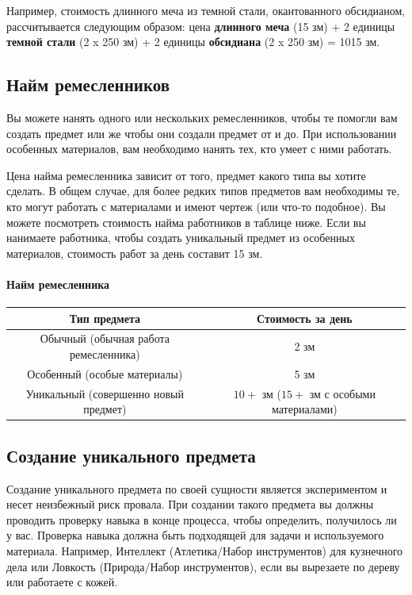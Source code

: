 \documentclass[a4paper, 9pt, twocolumn]{book}
\begin{document}
	Например, стоимость длинного меча из темной стали, окантованного обсидианом, рассчитывается следующим образом: цена \textbf{длинного меча} (15 зм) + 2 единицы \textbf{темной стали} (2 x 250 зм) + 2 единицы \textbf{обсидиана} (2 x 250 зм) = 1015 зм.
	
	\subsection{Найм ремесленников}
	
	Вы можете нанять одного или нескольких ремесленников, чтобы те помогли вам создать предмет или же чтобы они создали предмет от и до. При использовании особенных материалов, вам необходимо нанять тех, кто умеет с ними работать.
	
	Цена найма ремесленника зависит от того, предмет какого типа вы хотите сделать. В общем случае, для более редких типов предметов вам необходимы те, кто могут работать с материалами и имеют чертеж (или что-то подобное). Вы можете посмотреть стоимость найма работников в таблице ниже. Если вы нанимаете работника, чтобы создать уникальный предмет из особенных материалов, стоимость работ за день составит 15 зм.
	
	\paragraph{Найм ремесленника}
	
	\begin{tabular}{|c|c|}
		\hline
		\textbf{Тип предмета} & \textbf{Стоимость за день} \\
		\hline
		Обычный (обычная работа ремесленника) & 2 зм \\
		\hline
		Особенный (особые материалы) & 5 зм \\
		\hline
		Уникальный (совершенно новый предмет) & $10+$ зм ($15+$ зм с особыми материалами) \\
		\hline
	\end{tabular}
	
	\subsection{Создание уникального предмета}
	
	Создание уникального предмета по своей сущности является экспериментом и несет неизбежный риск провала. При создании такого предмета вы должны проводить проверку навыка в конце процесса, чтобы определить, получилось ли у вас. Проверка навыка должна быть подходящей для задачи и используемого материала. Например, Интеллект (Атлетика/Набор инструментов) для кузнечного дела или Ловкость (Природа/Набор инструментов), если вы вырезаете по дереву или работаете с кожей.
	
\end{document}
